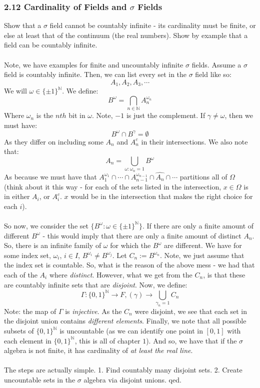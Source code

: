 \documentclass[12pt,a4paper]{article}
\newcommand{\1}[1]{\mathbbm{1}\left\{ #1 \right\}}
\newcommand{\N}{\mathbb{N}}
\begin{document}
\subsubsection{2.12 Cardinality of Fields and $\sigma$ Fields} Show that a $\sigma$ field cannot be countably infinite - its cardinality must be finite, or else at least that of the continuum (the real numbers). Show by example that a field can be countably infinite.
\\\\
Note, we have examples for finite and uncountably infinite $\sigma$ fields. Assume a $\sigma$ field is countably infinite. Then, we can list every set in the $\sigma$ field like so:
$$
	A_1, A_2, A_3, \cdots
$$
We will $\omega \in \{\pm 1\}^\N$. We define:
$$
	B^\omega = \bigcap_{n \in \N} A_n^{\omega_n}
$$
Where $\omega_n$ is the $nth$ bit in $\omega$. Note, $-1$ is just the complement. If $\gamma \neq \omega$, then we must have:
$$
	B^\omega \cap B^\gamma = \emptyset
$$
As they differ on including some $A_n$ and $A_n^c$ in their intersections. We also note that:
$$
	A_n = \bigcup_{\omega : \omega_n = 1} B^\omega
$$
As because we must have that $A_1^{\omega_1} \cap \cdots \cap A_{n-1}^{\omega_{n-1}} \cap \widehat{A_n} \cap \cdots$ partitions all of $\Omega$ (think about it this way - for each of the sets listed in the intersection, $x \in \Omega$ is in either $A_i$, or $A_i^c$. $x$ would be in the intersection that makes the right choice for each $i$).
\\\\
So now, we consider the set $\{B^\omega : \omega \in \{\pm 1\}^\N\}$. If there are only a finite amount of different $B^\omega$ - this would imply that there are only a finite amount of distinct $A_n$. So, there is an infinite family of $\omega$ for which the $B^\omega$ are different. We have for some index set, $\omega_i$, $i \in I$, $B^{\omega_i} \neq B^{\omega_j}$. Let $C_n := B^{\omega_n}$. Note, we just assume that the index set is countable. So, what is the reason of the above mess - we had that each of the $A_i$ where \textit{distinct}. However, what we get from the $C_n$, is that these are countably infinite sets that are \textit{disjoint}. Now, we define:
$$
	\Gamma: \{0,1\}^\N \to F, (\gamma) \to \bigcup_{\gamma_n = 1} C_n
$$
Note: the map of $\Gamma$ is \textit{injective}. As the $C_n$ were disjoint, we see that each set in the disjoint union contains \textit{different elements}. Finally, we note that all possible subsets of $\{0,1\}^\N$ is uncountable (as we can identify one point in $[0,1]$ with each element in $\{0,1\}^\N$, this is all of chapter $1$). And so, we have that if the $\sigma$ algebra is not finite, it has cardinality of \textit{at least the real line}.
\\\\
The steps are actually simple. 1. Find countably many disjoint sets. 2. Create uncountable sets in the $\sigma$ algebra via disjoint unions. qed.
\end{document}
